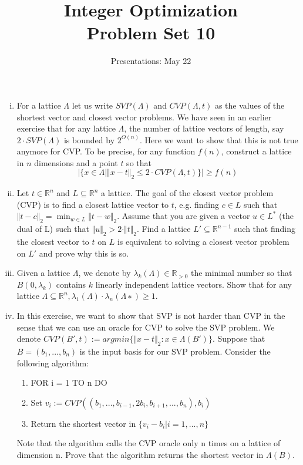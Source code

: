 \documentclass[11pt,a4paper]{article}
\title{Integer Optimization  \\ Problem Set 10 }
\date{Presentations: May 22}
\newcommand{\setR}{\mathbb{R}}
\begin{document}
\maketitle 




\begin{enumerate}[i)]
\item For a lattice $Λ$ let us write $SVP(Λ)$ and $CVP(Λ,t)$ as the values of the shortest vector and closest vector problems. We have seen in an earlier exercise that for any lattice $Λ$, the number of lattice vectors of length, say $2\cdot SVP(Λ)$ is bounded by $2^{O(n)}$. Here we want to show that this is not true anymore
for CVP. To be precise, for any function $f(n)$, construct a lattice in $n$ dimensions and a point $t$ so that
$$|\{x ∈ Λ | \Vert x − t\Vert_2 ≤ 2 \cdot CVP(Λ,t)\}| ≥ f (n)$$




\item Let $t ∈ \setR^n$ and $L ⊆ \setR^n$ a lattice. The goal of the closest vector problem (CVP) is to find a closest lattice
vector to $t$, e.g. finding $c ∈ L$ such that $\Vert t − c\Vert_2 = \min_{w∈L} \Vert t − w\Vert_2$. Assume that you are given a vector $u ∈ L^\ast$ (the dual of L) such that $\Vert u\Vert_2 > 2 \cdot \Vert t\Vert_2$. Find a lattice $L' ⊆ \setR^{n−1}$ such that finding the closest vector to $t$ on $L$ is equivalent to
solving a closest vector problem on $L'$ and prove why this is so.

\item Given a lattice $Λ$, we denote by $λ_k(Λ) ∈ \setR_{>0}$ the minimal number so that $B(0, λ_k)$ contains $k$ linearly
independent lattice vectors. Show that for any lattice $Λ ⊆ \setR^n,  λ_1(Λ) \cdot λ_n(Λ∗) ≥ 1$.


\item In this exercise, we want to show that SVP is not harder than CVP in the sense that we can use an oracle for CVP to solve the SVP problem. We denote $CVP(B',t) := argmin\{\Vert x − t\Vert_2 : x ∈ Λ(B')\}$. Suppose that $B = (b_1,...,b_n)$ is the input basis for our SVP problem. Consider the following algorithm:
\begin{enumerate}
    \item FOR i = 1 TO n DO
    \item Set $v_i:= CVP((b_1,...,b_{i−1}, 2b_i,b_{i+1},...,b_n),b_i)$
    \item Return the shortest vector in $\{v_i −b_i| i = 1,...,n\}$
\end{enumerate}
Note that the algorithm calls the CVP oracle only n times on a lattice of dimension n. Prove that the algorithm returns the shortest vector in $Λ(B)$.


  

    
\end{enumerate} 


%
%


 
\end{document}
